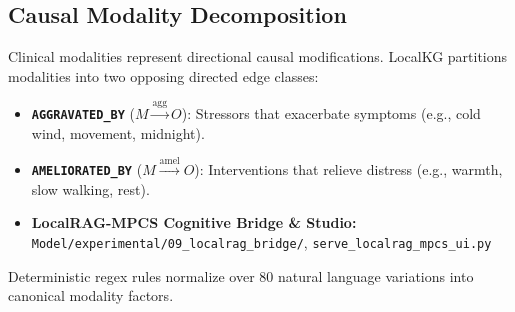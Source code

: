\documentclass[10pt,twocolumn,letterpaper]{article}
\begin{document}
\subsection{Causal Modality Decomposition}
Clinical modalities represent directional causal modifications. LocalKG partitions modalities into two opposing directed edge classes:
\begin{itemize}
  \item \textbf{\texttt{AGGRAVATED\_BY}} ($M \xrightarrow{\text{agg}} O$): Stressors that exacerbate symptoms (e.g., cold wind, movement, midnight).
  \item \textbf{\texttt{AMELIORATED\_BY}} ($M \xrightarrow{\text{amel}} O$): Interventions that relieve distress (e.g., warmth, slow walking, rest).
  \item \textbf{LocalRAG-MPCS Cognitive Bridge \& Studio:} \nolinkurl{Model/experimental/09_localrag_bridge/}, \nolinkurl{serve_localrag_mpcs_ui.py}
\end{itemize}
Deterministic regex rules normalize over 80 natural language variations into canonical modality factors.
\end{document}
